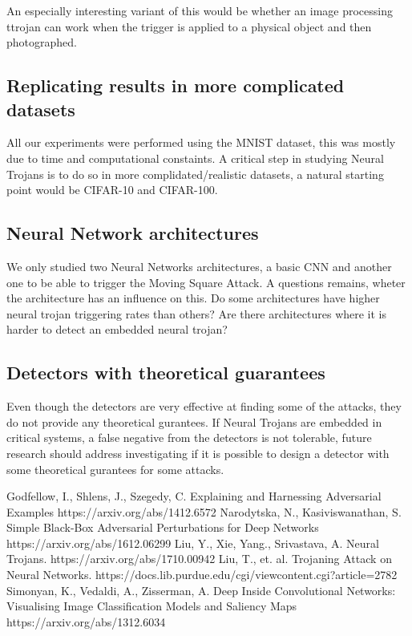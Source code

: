 \documentclass[letterpaper, 10 pt, conference]{ieeeconf}  %
\begin{document}
An especially interesting variant of this would be whether an image
processing ttrojan can work when the trigger is applied to a physical
object and then photographed.

\subsection{Replicating results in more complicated datasets}

All our experiments were performed using the MNIST dataset, this was mostly due
to time and computational constaints. A critical step in studying Neural
Trojans is to do so in more complidated/realistic datasets, a natural starting
point would be CIFAR-10 and CIFAR-100.

\subsection{Neural Network architectures}

We only studied two Neural Networks architectures, a basic CNN and another one
to be able to trigger the Moving Square Attack. A questions remains, wheter
the architecture has an influence on this. Do some architectures have higher
neural trojan triggering rates than others? Are there architectures where it
is harder to detect an embedded neural trojan?


\subsection{Detectors with theoretical guarantees}

Even though the detectors are very effective at finding some of the attacks,
they do not provide any theoretical gurantees. If Neural Trojans are embedded
in critical systems, a false negative from the detectors is not tolerable,
future research should address investigating if it is possible to design a
detector with some theoretical gurantees for some attacks.


\begin{thebibliography}{99}

 Godfellow, I., Shlens, J., Szegedy, C. Explaining and Harnessing Adversarial Examples https://arxiv.org/abs/1412.6572
 Narodytska, N., Kasiviswanathan, S. Simple Black-Box Adversarial Perturbations for Deep Networks https://arxiv.org/abs/1612.06299
 Liu, Y., Xie, Yang., Srivastava, A. Neural Trojans. https://arxiv.org/abs/1710.00942
 Liu, T., et. al. Trojaning Attack on Neural Networks. https://docs.lib.purdue.edu/cgi/viewcontent.cgi?article=2782 
 Simonyan, K., Vedaldi, A., Zisserman, A. Deep Inside Convolutional Networks: Visualising Image Classification Models and Saliency Maps https://arxiv.org/abs/1312.6034






\end{thebibliography}
\end{document}
